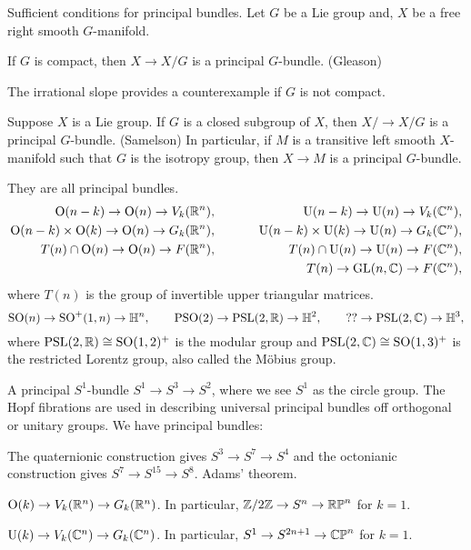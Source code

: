 \documentclass{../../large}
\begin{document}
\begin{prb}
Sufficient conditions for principal bundles.
Let $G$ be a Lie group and, $X$ be a free right smooth $G$-manifold.
\begin{parts}
\item If $G$ is compact, then $X\to X/G$ is a principal $G$-bundle. (Gleason)
\item The irrational slope provides a counterexample if $G$ is not compact.
\item Suppose $X$ is a Lie group.
If $G$ is a closed subgroup of $X$, then $X/\to X/G$ is a principal $G$-bundle. (Samelson) In particular, if $M$ is a transitive left smooth $X$-manifold such that $G$ is the isotropy group, then $X\to M$ is a principal $G$-bundle.
\end{parts}
\end{prb}

\begin{prb}
They are all principal bundles.
\begin{alignat*}{2}
\mathrm{O}(n-k)\to\mathrm{O}(n)\to V_k(\mathbb{R}^n),&&\qquad\qquad\qquad\mathrm{U}(n-k)\to\mathrm{U}(n)\to V_k(\mathbb{C}^n),&\\
\mathrm{O}(n-k)\times\mathrm{O}(k)\to\mathrm{O}(n)\to G_k(\mathbb{R}^n),&&\mathrm{U}(n-k)\times\mathrm{U}(k)\to\mathrm{U}(n)\to G_k(\mathbb{C}^n),&\\
T(n)\cap\mathrm{O}(n)\to\mathrm{O}(n)\to F(\mathbb{R}^n),&&T(n)\cap\mathrm{U}(n)\to\mathrm{U}(n)\to F(\mathbb{C}^n),&\\
&&T(n)\to\mathrm{GL}(n,\mathbb{C})\to F(\mathbb{C}^n),&
\end{alignat*}
where $T(n)$ is the group of invertible upper triangular matrices.
\[\mathrm{SO}(n)\to\mathrm{SO}^+(1,n)\to\mathbb{H}^n,\qquad\mathrm{PSO}(2)\to\mathrm{PSL}(2,\mathbb{R})\to\mathbb{H}^2,\qquad ??\to\mathrm{PSL}(2,\mathbb{C})\to\mathbb{H}^3,\]
where $\mathrm{PSL}(2,\mathbb{R})\cong\mathrm{SO}(1,2)^+$ is the modular group and $\mathrm{PSL}(2,\mathbb{C})\cong\mathrm{SO}(1,3)^+$ is the restricted Lorentz group, also called the M\"obius group.
\end{prb}

\begin{prb}
A principal $S^1$-bundle $S^1\to S^3\to S^2$, where we see $S^1$ as the circle group.
The Hopf fibrations are used in describing universal principal bundles off orthogonal or unitary groups.
We have principal bundles:
\begin{parts}
\item The quaternionic construction gives $S^3\to S^7\to S^4$ and the octonianic construction gives $S^7\to S^{15}\to S^8$. Adams' theorem.
\item $\mathrm{O}(k)\to V_k(\mathbb{R}^n)\to G_k(\mathbb{R}^n)$. In particular, $\mathbb{Z}/2\mathbb{Z}\to S^n\to\mathbb{RP}^n$ for $k=1$.
\item $\mathrm{U}(k)\to V_k(\mathbb{C}^n)\to G_k(\mathbb{C}^n)$. In particular, $S^1\to S^{2n+1}\to\mathbb{CP}^n$ for $k=1$.
\end{parts}
\end{prb}
\end{document}

